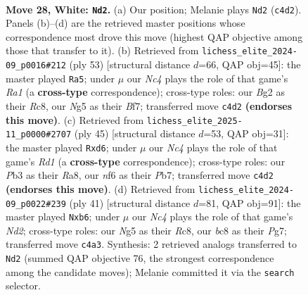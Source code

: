 \documentclass[11pt]{article}
\begin{document}
\begin{figure}[p]
\label{fig:thought-m52}
\end{figure}

\clearpage

\begin{figure}[p]\centering
\begin{subfigure}{0.46\textwidth}\centering
\resizebox{\linewidth}{!}{%
\newchessgame
\chessboard[
  setfen={1qb5/5pkp/rp3np1/6N1/PpN5/1P4P1/4RPBP/R5K1 w - - 6 28},
  showmover=false,
  pgfstyle=straightmove, color=movearrow, markmove={c4-d2}
]}
\caption{}
\end{subfigure}\hfill
\begin{subfigure}{0.46\textwidth}\centering
\resizebox{\linewidth}{!}{%
\newchessgame
\chessboard[
  setfen={r1r5/4pbkp/3p1pp1/1Bn5/2P1P3/Np3P1P/1Q4P1/3R3K b - - 0 27},
  showmover=false,
  pgfstyle=straightmove, color=movearrow, markmove={a8-a5}
]}
\caption{}
\end{subfigure}
\\[4pt]
\begin{subfigure}{0.46\textwidth}\centering
\resizebox{\linewidth}{!}{%
\newchessgame
\chessboard[
  setfen={r2r2k1/1p4pp/p1pP1p2/4n3/4PN2/1PQ3P1/R4PBP/3b2K1 b - - 0 23},
  showmover=false,
  pgfstyle=straightmove, color=movearrow, markmove={d8-d6}
]}
\caption{}
\end{subfigure}\hfill
\begin{subfigure}{0.46\textwidth}\centering
\resizebox{\linewidth}{!}{%
\newchessgame
\chessboard[
  setfen={r1r3k1/3n1ppp/pP2p3/1n1p4/3P1B2/1NP4P/1P2RPP1/R5K1 b - - 0 21},
  showmover=false,
  pgfstyle=straightmove, color=movearrow, markmove={d7-b6}
]}
\caption{}
\end{subfigure}
\caption{\textbf{Move 28, White: \texttt{Nd2}.} (a) Our position; Melanie plays \texttt{Nd2} (\texttt{c4d2}). Panels (b)--(d) are the retrieved master positions whose correspondence most drove this move (highest QAP objective among those that transfer to it). (b) Retrieved from \texttt{lichess\_elite\_2024-09\_p0016\#212} (ply 53) [structural distance $d$=66, QAP obj=45]: the master played \texttt{Ra5}; under $\mu$ our \emph{Nc4} plays the role of that game's \emph{Ra1} (a \textbf{cross-type} correspondence); cross-type roles: our \emph{B}g2 as their \emph{R}c8, our \emph{N}g5 as their \emph{B}f7; transferred move \texttt{c4d2} \textbf{(endorses this move)}. (c) Retrieved from \texttt{lichess\_elite\_2025-11\_p0000\#2707} (ply 45) [structural distance $d$=53, QAP obj=31]: the master played \texttt{Rxd6}; under $\mu$ our \emph{Nc4} plays the role of that game's \emph{Rd1} (a \textbf{cross-type} correspondence); cross-type roles: our \emph{P}b3 as their \emph{R}a8, our \emph{n}f6 as their \emph{P}b7; transferred move \texttt{c4d2} \textbf{(endorses this move)}. (d) Retrieved from \texttt{lichess\_elite\_2024-09\_p0022\#239} (ply 41) [structural distance $d$=81, QAP obj=91]: the master played \texttt{Nxb6}; under $\mu$ our \emph{Nc4} plays the role of that game's \emph{Nd2}; cross-type roles: our \emph{N}g5 as their \emph{R}c8, our \emph{b}c8 as their \emph{P}g7; transferred move \texttt{c4a3}. Synthesis: 2 retrieved analogs transferred to \texttt{Nd2} (summed QAP objective 76, the strongest correspondence among the candidate moves); Melanie committed it via the \texttt{search} selector.}

\end{figure}
\end{document}
